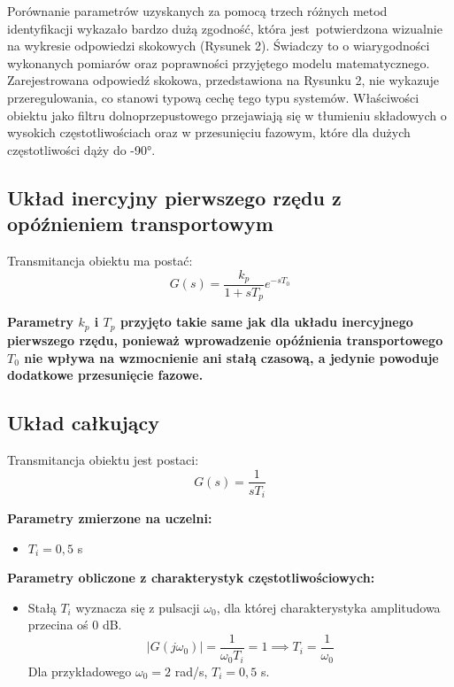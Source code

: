 \documentclass[12pt,a4paper]{article}
\begin{document}
	Porównanie parametrów uzyskanych za pomocą trzech różnych metod identyfikacji wykazało bardzo dużą zgodność, która jest potwierdzona wizualnie na wykresie odpowiedzi skokowych (Rysunek 2). Świadczy to o wiarygodności wykonanych pomiarów oraz poprawności przyjętego modelu matematycznego. Zarejestrowana odpowiedź skokowa, przedstawiona na Rysunku 2, nie wykazuje przeregulowania, co stanowi typową cechę tego typu systemów. Właściwości obiektu jako filtru dolnoprzepustowego przejawiają się w tłumieniu składowych o wysokich częstotliwościach oraz w przesunięciu fazowym, które dla dużych częstotliwości dąży do -90°.
	
	\subsection{Układ inercyjny pierwszego rzędu z opóźnieniem transportowym}
	
	Transmitancja obiektu ma postać:
	\begin{equation}
		G(s) = \frac{k_p}{1 + sT_p} e^{-sT_0}
	\end{equation}
		
	\noindent \textbf{Parametry $k_p$ i $T_p$ przyjęto takie same jak dla układu inercyjnego pierwszego rzędu, 
		ponieważ wprowadzenie opóźnienia transportowego $T_0$ nie wpływa na wzmocnienie ani stałą czasową, a jedynie powoduje dodatkowe przesunięcie fazowe.}
	
	\subsection{Układ całkujący}
	Transmitancja obiektu jest postaci:
	\begin{equation}
		G(s) = \frac{1}{sT_i}
	\end{equation}
	
	\noindent \textbf{Parametry zmierzone na uczelni:}
	\begin{itemize}
		\item $T_i = 0{,}5$ s %
	\end{itemize}
	
	\noindent \textbf{Parametry obliczone z charakterystyk częstotliwościowych:}
	\begin{itemize}
		\item Stałą $T_i$ wyznacza się z pulsacji $\omega_0$, dla której charakterystyka amplitudowa przecina oś 0 dB.
		$$|G(j\omega_0)| = \frac{1}{\omega_0 T_i} = 1 \implies T_i = \frac{1}{\omega_0}$$
		Dla przykładowego $\omega_0 = 2$ rad/s, $T_i=0,5$ s.
	\end{itemize}
	
\end{document}
